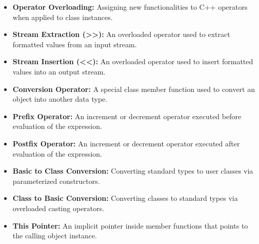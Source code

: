 \documentclass[12pt,a4paper]{article}
\begin{document}
\begin{tcolorbox}[defbox, title={\textbf{One-Line Definitions}}]
\begin{itemize}[leftmargin=*, itemsep=2.5pt, topsep=0pt]
  \item \textbf{Operator Overloading:} Assigning new functionalities to C++ operators when applied to class instances.
  \item \textbf{Stream Extraction (>>):} An overloaded operator used to extract formatted values from an input stream.
  \item \textbf{Stream Insertion (<<):} An overloaded operator used to insert formatted values into an output stream.
  \item \textbf{Conversion Operator:} A special class member function used to convert an object into another data type.
  \item \textbf{Prefix Operator:} An increment or decrement operator executed before evaluation of the expression.
  \item \textbf{Postfix Operator:} An increment or decrement operator executed after evaluation of the expression.
  \item \textbf{Basic to Class Conversion:} Converting standard types to user classes via parameterized constructors.
  \item \textbf{Class to Basic Conversion:} Converting classes to standard types via overloaded casting operators.
  \item \textbf{This Pointer:} An implicit pointer inside member functions that points to the calling object instance.
\end{itemize}
\end{tcolorbox}
\end{document}
